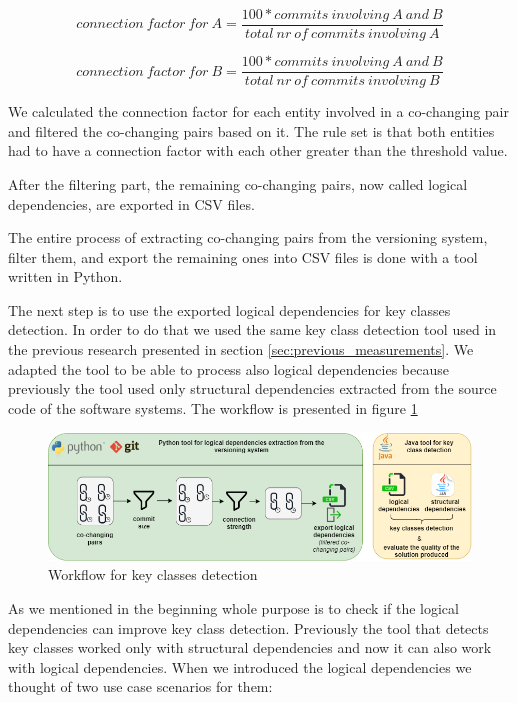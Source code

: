 \documentclass[12pt]{mitthesis}
\begin{document}
\[ connection\ factor\ for\ A 
  = \dfrac{100 * commits\ involving\ A\ and\ B}{total\ nr\ of\ commits\ involving\ A}
\]

\[ connection\ factor\ for\ B 
  = \dfrac{100 * commits\ involving\ A\ and\ B}{total\ nr\ of\ commits\ involving\ B}
\]

We calculated the connection factor for each entity involved in a co-changing pair and filtered the co-changing pairs based on it. The rule set is that both entities had to have a connection factor with each other greater than the threshold value.

After the filtering part, the remaining co-changing pairs, now called logical dependencies, are exported in CSV files.

The entire process of extracting co-changing pairs from the versioning system, filter them, and export the remaining ones into CSV files is done with a tool written in Python.

The next step is to use the exported logical dependencies for key classes detection. In order to do that we used the same key class detection tool used in the previous research presented in section \ref{sec:previous_measurements}. We adapted the tool to be able to process also logical dependencies because previously the tool used only structural dependencies extracted from the source code of the software systems. 
The workflow is presented in figure \ref{fig:workflow_key}

\begin{figure}[H]
\centering
\includegraphics[width=\textwidth]{key_class_workflow.png}
\caption{Workflow for key classes detection}
\label{fig:workflow_key}
\centering
\end{figure}


As we mentioned in the beginning whole purpose is to check if the logical dependencies can improve key class detection. Previously the tool that detects key classes worked only with structural dependencies and now it can also work with logical dependencies. When we introduced the logical dependencies we thought of two use case scenarios for them:
\end{document}
